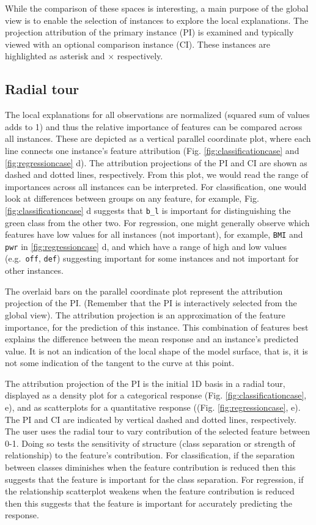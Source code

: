 \documentclass[
]{article}
\begin{document}
While the comparison of these spaces is interesting, a main purpose of the global view is to enable the selection of instances to explore the local explanations. The projection attribution of the primary instance (PI) is examined and typically viewed with an optional comparison instance (CI). These instances are highlighted as asterisk and \(\times\) respectively.

\hypertarget{radial-tour}{%
\subsection{Radial tour}\label{radial-tour}}

The local explanations for all observations are normalized (squared sum of values adds to 1) and thus the relative importance of features can be compared across all instances. These are depicted as a vertical parallel coordinate plot, where each line connects one instance's feature attribution (Fig. \ref{fig:classificationcase} and \ref{fig:regressioncase} d). The attribution projections of the PI and CI are shown as dashed and dotted lines, respectively. From this plot, we would read the range of importances across all instances can be interpreted. For classification, one would look at differences between groups on any feature, for example, Fig. \ref{fig:classificationcase} d suggests that \texttt{b\_l} is important for distinguishing the green class from the other two. For regression, one might generally observe which features have low values for all instances (not important), for example, \texttt{BMI} and \texttt{pwr} in \ref{fig:regressioncase} d, and which have a range of high and low values (e.g.~\texttt{off}, \texttt{def}) suggesting important for some instances and not important for other instances.

The overlaid bars on the parallel coordinate plot represent the attribution projection of the PI. (Remember that the PI is interactively selected from the global view). The attribution projection is an approximation of the feature importance, for the prediction of this instance. This combination of features best explains the difference between the mean response and an instance's predicted value. It is not an indication of the local shape of the model surface, that is, it is not some indication of the tangent to the curve at this point.

The attribution projection of the PI is the initial 1D basis in a radial tour, displayed as a density plot for a categorical response (Fig. \ref{fig:classificationcase}, e), and as scatterplots for a quantitative response ((Fig. \ref{fig:regressioncase}, e). The PI and CI are indicated by vertical dashed and dotted lines, respectively. The user uses the radial tour to vary contribution of the selected feature between 0-1. Doing so tests the sensitivity of structure (class separation or strength of relationship) to the feature's contribution. For classification, if the separation between classes diminishes when the feature contribution is reduced then this suggests that the feature is important for the class separation. For regression, if the relationship scatterplot weakens when the feature contribution is reduced then this suggests that the feature is important for accurately predicting the response.
\end{document}
